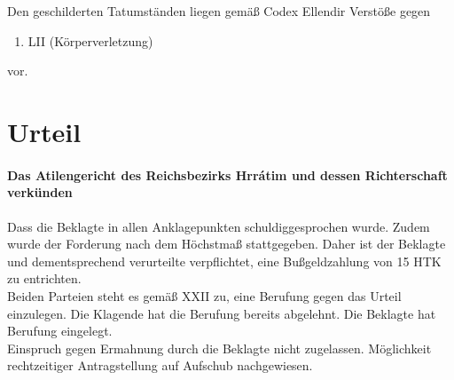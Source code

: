 \documentclass{article}
\begin{document}
Den geschilderten Tatumständen liegen gemäß Codex Ellendir Verstöße gegen

\begin{enumerate}
    \item LII (Körperverletzung)
\end{enumerate}

vor.
\newpage
\section{Urteil}
\paragraph{Das Atilengericht des Reichsbezirks Hrrátim und dessen Richterschaft verkünden\\}
Dass die Beklagte in allen Anklagepunkten schuldiggesprochen wurde. Zudem wurde der Forderung nach dem
Höchstmaß stattgegeben. Daher ist der Beklagte und dementsprechend verurteilte verpflichtet,
eine Bußgeldzahlung von 15 HTK zu entrichten.\\
Beiden Parteien steht es gemäß XXII zu, eine Berufung gegen das Urteil einzulegen. Die Klagende hat die Berufung bereits
abgelehnt. Die Beklagte hat Berufung eingelegt.\\
Einspruch gegen Ermahnung durch die Beklagte nicht zugelassen. Möglichkeit rechtzeitiger Antragstellung auf Aufschub nachgewiesen.
\end{document}
